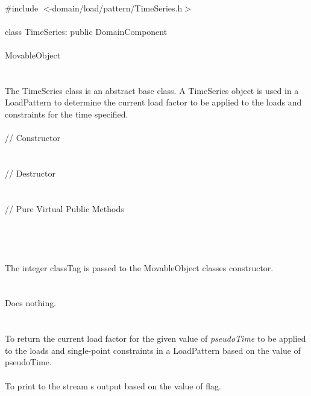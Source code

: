 
   \\
\indent \#include $<\tilde{ }$domain/load/pattern/TimeSeries.h$>$  \\

  \\
\indent class TimeSeries: public DomainComponent  \\

 \\
\indent MovableObject \\
\indent{} \\

 \\ 
\indent The TimeSeries class is an abstract base class. A
TimeSeries object is used in a LoadPattern to determine the current
load factor to be applied to the loads and constraints for the time
specified. \\ 

 \\
\indent // Constructor \\ 
\\ \\
\indent // Destructor \\ 
\\  \\
\indent // Pure Virtual Public Methods \\ 
\\
\\

 \\ 
\\ 
The integer \p classTag is passed to the MovableObject classes
constructor. \\

 \\
\\ 
Does nothing. \\

 \\
\\
To return the current load factor for the given value of {\em
pseudoTime} to be applied to the loads and single-point constraints in
a LoadPattern based on the value of \p pseudoTime. \\

\\
To print to the stream \p s output based on the value of \p flag.
